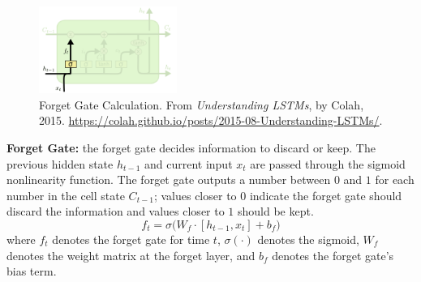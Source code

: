 \begin{program}
\begin{figure}
\vspace{-20pt}
\begin{center}
    \includegraphics[width=0.4\textwidth]{imgs/lstm_forgetGate.png}
\end{center}
\vspace{-20pt}
\caption{\footnotesize Forget Gate Calculation. From \emph{Understanding LSTMs}, by Colah, 2015. \url{https://colah.github.io/posts/2015-08-Understanding-LSTMs/}. }
\vspace{-5pt}
\end{figure}

\textbf{Forget Gate: } the forget gate decides information to discard or keep. The previous hidden state $h_{t-1}$ and current input $x_t$ are passed through the sigmoid nonlinearity function. The forget gate outputs a number between $0$ and $1$ for each number in the cell state $C_{t-1}$; values closer to $0$ indicate the forget gate should discard the information and values closer to $1$ should be kept. 
$$
f_t = \sigma \Big( W_f \cdot [h_{t-1}, x_t] + b_f \Big)
$$
where $f_t$ denotes the forget gate for time $t$, $\sigma(\cdot)$ denotes the sigmoid, $W_f$ denotes the weight matrix at the forget layer, and $b_f$ denotes the forget gate's bias term. 
\end{program}


